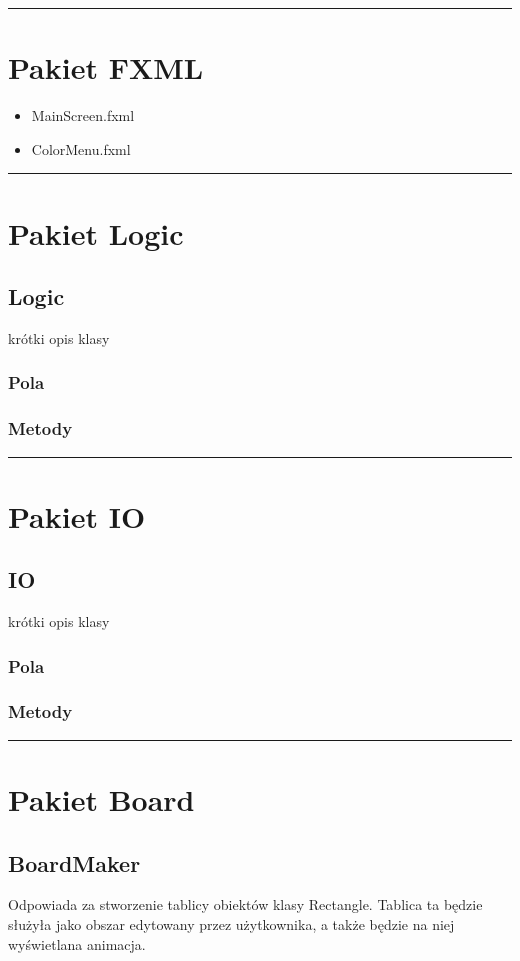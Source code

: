 \documentclass[a4paper,11pt]{article}
\newcommand{\linia}{\rule{\linewidth}{0.4mm}}
\begin{document}
\noindent\linia

\section{Pakiet FXML}
\begin{itemize}
\item MainScreen.fxml
\item ColorMenu.fxml
\end{itemize}
\noindent\linia

\section{Pakiet Logic}

\subsection{Logic}
krótki opis klasy
\subsubsection{Pola}

\subsubsection{Metody}



\noindent\linia
\section{Pakiet IO}
\subsection{IO}
krótki opis klasy
\subsubsection{Pola}

\subsubsection{Metody}



\noindent\linia

\section{Pakiet Board}

\subsection{BoardMaker}
Odpowiada za stworzenie tablicy obiektów klasy Rectangle. Tablica ta będzie służyła jako obszar edytowany przez użytkownika, a także będzie na niej wyświetlana animacja.
\end{document}
